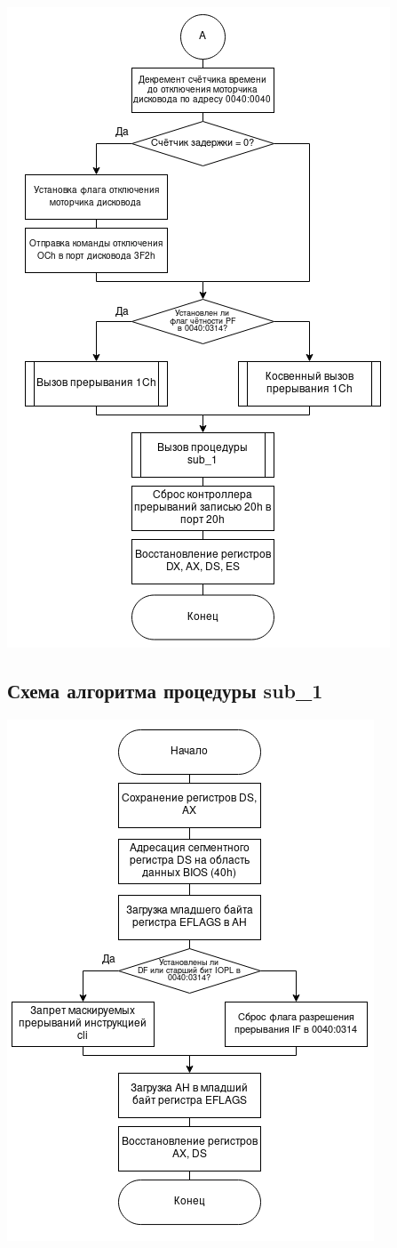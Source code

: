 \documentclass[a4paper,12pt]{article}
\begin{document}
\includegraphics{inc/img/int8h_2}

\subsection{Схема алгоритма процедуры sub\_1}

\includegraphics{inc/img/sub_1}


%
\end{document}
